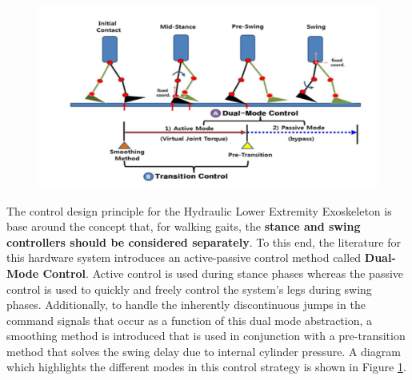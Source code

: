  \begin{figure}[thpb]
\centering
\includegraphics[width=5.in]{exos/figs/hydLowerExrem/dualModeDia}
  \caption{}
  \vspace{-0.2in}
 \label{fig:dualModeDia}   
 \end{figure}
The control design principle for the Hydraulic Lower Extremity Exoskeleton is base around the concept that, for walking gaits, the {\bf stance and swing controllers should be considered separately}.  To this end, the literature for this hardware system introduces an active-passive control method called {\bf Dual-Mode Control}.  Active control is used during stance phases whereas the passive control is used to quickly and freely control the system's legs during swing phases.  Additionally, to handle the inherently discontinuous jumps in the command signals that occur as a function of this dual mode abstraction, a smoothing method is introduced that is used in conjunction with a pre-transition method that solves the swing delay due to internal cylinder pressure.  A diagram which highlights the different modes in this control strategy is shown in Figure \ref{fig:dualModeDia}.   


